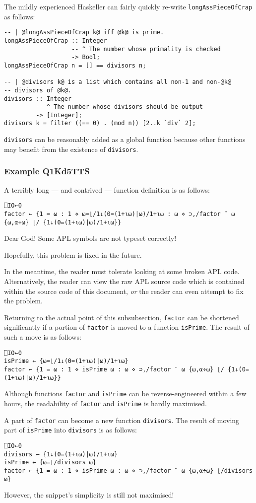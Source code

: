 \documentclass{report}
\begin{document}
The mildly experienced Haskeller can fairly quickly re-write \texttt{longAssPieceOfCrap} as follows:
\begin{lstlisting}
-- | @longAssPieceOfCrap k@ iff @k@ is prime.
longAssPieceOfCrap :: Integer
                   -- ^ The number whose primality is checked
                   -> Bool;
longAssPieceOfCrap n = [] == divisors n;

-- | @divisors k@ is a list which contains all non-1 and non-@k@
-- divisors of @k@.
divisors :: Integer
         -- ^ The number whose divisors should be output
         -> [Integer];
divisors k = filter ((== 0) . (mod n)) [2..k `div` 2];
\end{lstlisting}
\texttt{divisors} can be reasonably added as a global function because other functions may benefit from the existence of \texttt{divisors}.
\subsubsection{Example Q1Kd5TTS}
A terribly long --- and contrived --- function definition is as follows:
\begin{lstlisting}
⎕IO←0
factor ← {1 = ⍵ : 1 ⋄ ⍵=⌊/1↓(0=(1+⍳⍵)|⍵)/1+⍳⍵ : ⍵ ⋄ ⊃,/factor ¨ ⍵ {⍵,⍺÷⍵} ⌊/ {1↓(0=(1+⍳⍵)|⍵)/1+⍳⍵}}
\end{lstlisting}
Dear God!  Some APL symbols are not typeset correctly!

Hopefully, this problem is fixed in the future.

In the meantime, the reader must tolerate looking at some broken APL code.  Alternatively, the reader can view the raw APL source code which is contained within the source code of this document, \textit{or} the reader can even attempt to fix the problem.

Returning to the actual point of this subsubsection, \texttt{factor} can be shortened significantly if a portion of \texttt{factor} is moved to a function \texttt{isPrime}.  The result of such a move is as follows:
\begin{lstlisting}
⎕IO←0
isPrime ← {⍵=⌊/1↓(0=(1+⍳⍵)|⍵)/1+⍳⍵}
factor ← {1 = ⍵ : 1 ⋄ isPrime ⍵ : ⍵ ⋄ ⊃,/factor ¨ ⍵ {⍵,⍺÷⍵} ⌊/ {1↓(0=(1+⍳⍵)|⍵)/1+⍳⍵}}
\end{lstlisting}
Although functions \texttt{factor} and \texttt{isPrime} can be reverse-engineered within a few hours, the readability of \texttt{factor} and \texttt{isPrime} is hardly maximised.

A part of \texttt{factor} can become a new function \texttt{divisors}.  The result of moving part of \texttt{isPrime} into \texttt{divisors} is as follows:
\begin{lstlisting}
⎕IO←0
divisors ← {1↓(0=(1+⍳⍵)|⍵)/1+⍳⍵}
isPrime ← {⍵=⌊/divisors ⍵}
factor ← {1 = ⍵ : 1 ⋄ isPrime ⍵ : ⍵ ⋄ ⊃,/factor ¨ ⍵ {⍵,⍺÷⍵} ⌊/divisors ⍵}
\end{lstlisting}
However, the snippet's simplicity is still not maximised!
\end{document}
